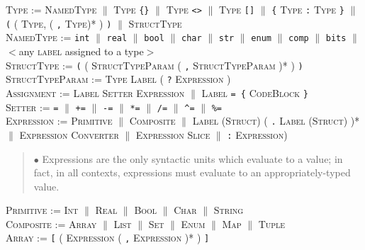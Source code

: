 \documentclass{article}
\newcommand{\code}[1]{\colorbox{light-gray}{\texttt{#1}}}
\begin{document}
\textsc{Type} := \textsc{NamedType} $\|$ \textsc{Type} \code{\{\}} $\|$ \textsc{Type} \code{<>} $\|$ \textsc{Type} \code{[]} $\|$ \code{\{} \textsc{Type} \code{:} \textsc{Type} \code{\}} $\|$ \code{(} ( \textsc{Type}, ( \code{,} \textsc{Type})* ) \code{)} $\|$ \textsc{StructType} \\

\textsc{NamedType} := \code{int} $\|$ \code{real} $\|$ \code{bool} $\|$ \code{char} $\|$ \code{str} $\|$ \code{enum} $\|$ \code{comp} $\|$ \code{bits} $\|$ $<$any \textsc{label} assigned to a type$>$ \\

\textsc{StructType} := \code{(} ( \textsc{StructTypeParam} ( \code{,} \textsc{StructTypeParam} )* ) \code{)} \\

\textsc{StructTypeParam} := \textsc{Type} \textsc{Label} ( \code{?} \textsc{Expression} ) \\

\textsc{Assignment} := \textsc{Label} \textsc{Setter} \textsc{Expression} $\|$ \textsc{Label} \code{= \{} \textsc{CodeBlock} \code{\}} \\

\textsc{Setter} := \code{=} $\|$ \code{+=} $\|$ \code{-=} $\|$ \code{*=} $\|$ \code{/=} $\|$ \code{\^{}=} $\|$ \code{\%=} \\

\textsc{Expression} := \textsc{Primitive} $\|$ \textsc{Composite} $\|$ \textsc{Label} (\textsc{Struct}) ( \code{.} \textsc{Label} (\textsc{Struct}) )* $\|$ \textsc{Expression} \textsc{Converter} $\|$ \textsc{Expression} \textsc{Slice} $\|$ \code{:} \textsc{Expression})

\begin{quote} $\bullet$ Expressions are the only syntactic units which evaluate to a value; in fact, in all contexts, expressions must evaluate to an appropriately-typed value. \end{quote}

\textsc{Primitive} := \textsc{Int} $\|$ \textsc{Real} $\|$ \textsc{Bool} $\|$ \textsc{Char} $\|$ \textsc{String} \\

\textsc{Composite} := \textsc{Array} $\|$ \textsc{List} $\|$ \textsc{Set} $\|$ \textsc{Enum} $\|$ \textsc{Map} $\|$ \textsc{Tuple} \\

\textsc{Array} := \code{[} ( \textsc{Expression} ( \code{,} \textsc{Expression} )* ) \code{]} \\
\end{document}
